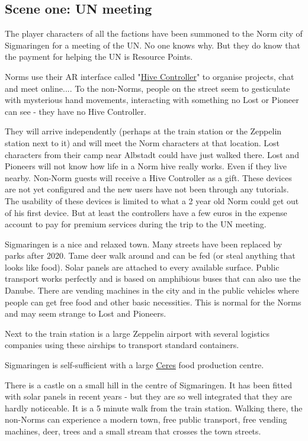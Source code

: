 \subsection{Scene one: UN meeting}

The player characters of all the factions have been summoned to the Norm city of Sigmaringen for a meeting of the UN. No one knows why. But they do know that the payment for helping the UN is Resource Points.

Norms use their AR interface called "\hyperref[sec:Hive controller]{Hive Controller}" to organise projects, chat and meet online.... To the non-Norms, people on the street seem to gesticulate with mysterious hand movements, interacting with something no Lost or Pioneer can see - they have no Hive Controller.

They will arrive independently (perhaps at the train station or the Zeppelin station next to it) and will meet the Norm characters at that location. Lost characters from their camp near Albstadt could have just walked there. Lost and Pioneers will not know how life in a Norm hive really works. Even if they live nearby.
Non-Norm guests will receive a Hive Controller as a gift. These devices are not yet configured and the new users have not been through any tutorials. The usability of these devices is limited to what a 2 year old Norm could get out of his first device. But at least the controllers have a few euros in the expense account to pay for premium services during the trip to the UN meeting.

Sigmaringen is a nice and relaxed town. Many streets have been replaced by parks after 2020. Tame deer walk around and can be fed (or steal anything that looks like food). Solar panels are attached to every available surface. Public transport works perfectly and is based on amphibious buses that can also use the Danube. There are vending machines in the city and in the public vehicles where people can get free food and other basic necessities. This is normal for the Norms and may seem strange to Lost and Pioneers.

Next to the train station is a large Zeppelin airport with several logistics companies using these airships to transport standard containers.

Sigmaringen is self-sufficient with a large \hyperref[sec: norm food]{Ceres} food production centre.

There is a castle on a small hill in the centre of Sigmaringen. It has been fitted with solar panels in recent years - but they are so well integrated that they are hardly noticeable. It is a 5 minute walk from the train station. Walking there, the non-Norms can experience a modern town, free public transport, free vending machines, deer, trees and a small stream that crosses the town streets.

